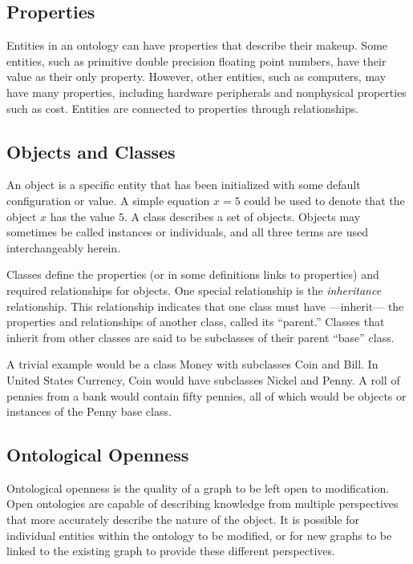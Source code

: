\subsection{Properties}

Entities in an ontology can have properties that describe their makeup. Some
entities, such as primitive double precision floating point numbers, have their
value as their only property. However, other entities, such as computers, may
have many properties, including hardware peripherals and nonphysical properties
such as cost. Entities are connected to properties through relationships.

\subsection{Objects and Classes}

An object is a specific entity that has been initialized with some default
configuration or value. A simple equation $x = 5$ could be used to denote that
the object $x$ has the value $5$. A class describes a set of objects. Objects
may sometimes be called instances or individuals, and all three terms are used
interchangeably herein.

Classes define the properties (or in some definitions links to properties) and
required relationships for objects. One special relationship is the
\textit{inheritance} relationship. This relationship indicates that one class
must have ---inherit--- the properties and relationships of another class,
called its ``parent.'' Classes that inherit from other classes are said to be
subclasses of their parent ``base'' class.

A trivial example would be a class Money with subclasses Coin and Bill. In
United States Currency, Coin would have subclasses Nickel and Penny. A roll of
pennies from a bank would contain fifty pennies, all of which would be objects
or instances of the Penny base class.

\subsection{Ontological Openness}
\label{ont-openess}

Ontological openness is the quality of a graph to be left open to modification.
Open ontologies are capable of describing knowledge from multiple perspectives
that more accurately describe the nature of the object. It is possible for
individual entities within the ontology to be modified, or for new graphs to be
linked to the existing graph to provide these different perspectives.

